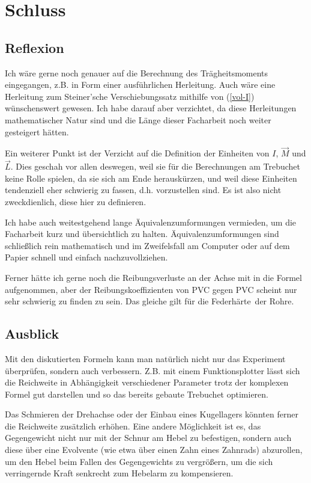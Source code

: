 \chapter{Schluss}
\section{Reflexion}
Ich wäre gerne noch genauer auf die Berechnung des Trägheitsmoments eingegangen, z.B. in Form einer ausführlichen Herleitung. Auch wäre eine Herleitung zum Steiner'sche Verschiebungssatz mithilfe von (\ref{vol-I}) wünschenswert gewesen. Ich habe darauf aber verzichtet, da diese Herleitungen mathematischer Natur sind und die Länge dieser Facharbeit noch weiter gesteigert hätten.

Ein weiterer Punkt ist der Verzicht auf die Definition der Einheiten von $I$, $\vec M$ und $\vec L$. Dies geschah vor allen deswegen, weil sie für die Berechnungen am Trebuchet keine Rolle spielen, da sie sich am Ende herauskürzen, und weil diese Einheiten tendenziell eher schwierig zu fassen, d.h. vorzustellen sind. Es ist also nicht zweckdienlich, diese hier zu definieren.

Ich habe auch weitestgehend lange Äquivalenzumformungen vermieden, um die Facharbeit kurz und übersichtlich zu halten. Äquivalenzumformungen sind schließlich rein mathematisch und im Zweifelsfall am Computer oder auf dem Papier schnell und einfach nachzuvollziehen.

Ferner  hätte ich gerne noch die Reibungsverluste an der Achse mit in die Formel aufgenommen, aber der Reibungskoeffizienten von PVC gegen PVC scheint nur sehr schwierig zu finden zu sein. Das gleiche gilt für die \glqq Federhärte\grqq \ der Rohre.

\section{Ausblick}
Mit den diskutierten Formeln kann man natürlich nicht nur das Experiment überprüfen, sondern auch verbessern. Z.B. mit einem Funktionsplotter lässt sich die Reichweite in Abhängigkeit verschiedener Parameter trotz der komplexen Formel gut darstellen und so das bereits gebaute Trebuchet optimieren.

Das Schmieren der Drehachse oder der Einbau eines Kugellagers könnten ferner die Reichweite zusätzlich erhöhen. Eine andere Möglichkeit ist es, das Gegengewicht nicht nur mit der Schnur am Hebel zu befestigen, sondern auch diese über eine Evolvente (wie etwa über einen Zahn eines Zahnrads) abzurollen, um den Hebel beim Fallen des Gegengewichts zu vergrößern, um die sich verringernde Kraft senkrecht zum Hebelarm zu kompensieren.

